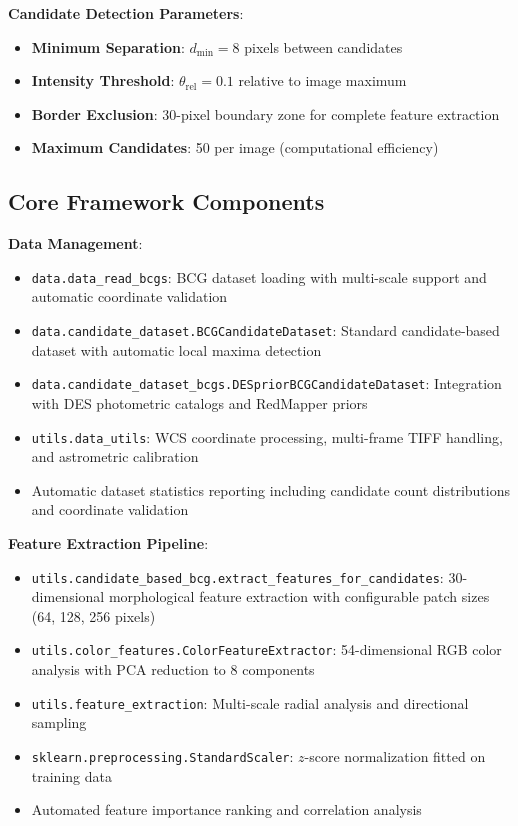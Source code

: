 \documentclass[twocolumn,10pt]{aastex631}
\begin{document}
\textbf{Candidate Detection Parameters}:
\begin{itemize}
\item \textbf{Minimum Separation}: $d_{\text{min}} = 8$ pixels between candidates
\item \textbf{Intensity Threshold}: $\theta_{\text{rel}} = 0.1$ relative to image maximum
\item \textbf{Border Exclusion}: 30-pixel boundary zone for complete feature extraction
\item \textbf{Maximum Candidates}: 50 per image (computational efficiency)
\end{itemize}

\subsection{Core Framework Components}

\textbf{Data Management}:
\begin{itemize}
\item \texttt{data.data\_read\_bcgs}: BCG dataset loading with multi-scale support and automatic coordinate validation
\item \texttt{data.candidate\_dataset.BCGCandidateDataset}: Standard candidate-based dataset with automatic local maxima detection
\item \texttt{data.candidate\_dataset\_bcgs.DESpriorBCGCandidateDataset}: Integration with DES photometric catalogs and RedMapper priors
\item \texttt{utils.data\_utils}: WCS coordinate processing, multi-frame TIFF handling, and astrometric calibration
\item Automatic dataset statistics reporting including candidate count distributions and coordinate validation
\end{itemize}

\textbf{Feature Extraction Pipeline}:
\begin{itemize}
\item \texttt{utils.candidate\_based\_bcg.extract\_features\_for\_candidates}: 30-dimensional morphological feature extraction with configurable patch sizes (64, 128, 256 pixels)
\item \texttt{utils.color\_features.ColorFeatureExtractor}: 54-dimensional RGB color analysis with PCA reduction to 8 components
\item \texttt{utils.feature\_extraction}: Multi-scale radial analysis and directional sampling
\item \texttt{sklearn.preprocessing.StandardScaler}: $z$-score normalization fitted on training data
\item Automated feature importance ranking and correlation analysis
\end{itemize}
\end{document}

